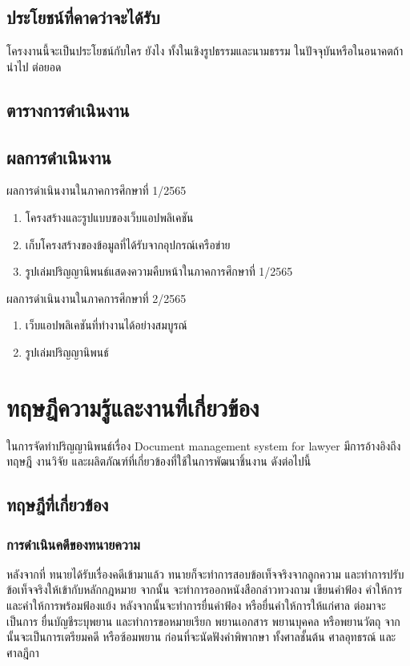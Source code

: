 \documentclass[12pt,oneside,openright,a4paper]{cpe-thai-project}
\begin{document}
\section{ประโยชน์ที่คาดว่าจะได้รับ}

โครงงานนี้จะเป็นประโยชน์กับใคร ยังไง ทั้งในเชิงรูปธรรมและนามธรรม ในปัจจุบันหรือในอนาคตถ้านำไป
ต่อยอด

\section{ตารางการดำเนินงาน}

\newpage
\section{ผลการดำเนินงาน}
ผลการดำเนินงานในภาคการศึกษาที่ 1/2565
\begin{enumerate}
  \item โครงสร้างและรูปแบบของเว็บแอปพลิเคชัน
  \item เก็บโครงสร้างของข้อมูลที่ได้รับจากอุปกรณ์เครือข่าย
  \item รูปเล่มปริญญานิพนธ์แสดงความคืบหน้าในภาคการศึกษาที่ 1/2565
\end{enumerate}
ผลการดำเนินงานในภาคการศึกษาที่ 2/2565
\begin{enumerate}
  \item เว็บแอปพลิเคชันที่ทำงานได้อย่างสมบูรณ์
  \item รูปเล่มปริญญานิพนธ์
\end{enumerate}

\chapter{ทฤษฎีความรู้และงานที่เกี่ยวข้อง}

\hspace*{1cm}ในการจัดทําปริญญานิพนธ์เรื่อง Document management system for lawyer มีการอ้างอิงถึงทฤษฎี งานวิจัย และผลิตภัณฑ์ที่เกี่ยวข้องที่ใช้ในการพัฒนาชิ้นงาน ดังต่อไปนี้

\section{ทฤษฎีที่เกี่ยวข้อง}


\subsection{การดำเนินคดีของทนายความ} 
\hspace*{1cm}หลังจากที่ ทนายได้รับเรื่องคดีเข้ามาแล้ว ทนายก็จะทำการสอบข้อเท็จจริงจากลูกความ และทำการปรับข้อเท็จจริงให้เข้ากับหลักกฎหมาย จากนั้น จะทำการออกหนังสือกล่าวทวงถาม เขียนคำฟ้อง คำให้การ และคำให้การพร้อมฟ้องแย้ง หลังจากนั้นจะทำการยื่นคำฟ้อง หรือยื่นคำให้การให้แก่ศาล ต่อมาจะเป็นการ ยื่นบัญชีระบุพยาน และทำการขอหมายเรียก พยานเอกสาร พยานบุคคล หรือพยานวัตถุ จากนั้นจะเป็นการเตรียมคดี หรือซ้อมพยาน ก่อนที่จะนัดฟังคำพิพากษา ทั้งศาลชั้นต้น ศาลอุทธรณ์ และศาลฎีกา 
\end{document}
